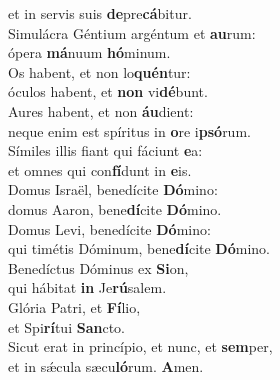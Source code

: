 \evenverse et in servis suis \textbf{de}pre\textbf{cá}bitur.\\
\oddverse Simulácra Géntium argéntum et \textbf{au}rum:~\*\\
\oddverse ópera \textbf{má}nuum \textbf{hó}minum.\\
\evenverse Os habent, et non lo\textbf{quén}tur:~\*\\
\evenverse óculos habent, et \textbf{non} vi\textbf{dé}bunt.\\
\oddverse Aures habent, et non \textbf{áu}dient:~\*\\
\oddverse neque enim est spíritus in \textbf{o}re i\textbf{psó}rum.\\
\evenverse Símiles illis fiant qui fáciunt \textbf{e}a:~\*\\
\evenverse et omnes qui con\textbf{fí}dunt in \textbf{e}is.\\
\oddverse Domus Israël, benedícite \textbf{Dó}mino:~\*\\
\oddverse domus Aaron, bene\textbf{dí}cite \textbf{Dó}mino.\\
\evenverse Domus Levi, benedícite \textbf{Dó}mino:~\*\\
\evenverse qui timétis Dóminum, bene\textbf{dí}cite \textbf{Dó}mino.\\
\oddverse Benedíctus Dóminus ex \textbf{Si}on,~\*\\
\oddverse qui hábitat \textbf{in} Je\textbf{rú}salem.\\
\evenverse Glória Patri, et \textbf{Fí}lio,~\*\\
\evenverse et Spi\textbf{rí}tui \textbf{San}cto.\\
\oddverse Sicut erat in princípio, et nunc, et \textbf{sem}per,~\*\\
\oddverse et in sǽcula sæcu\textbf{ló}rum. \textbf{A}men.\\
